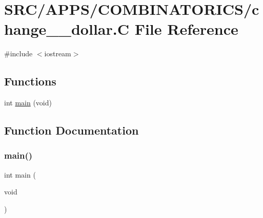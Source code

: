\hypertarget{change__1__dollar_8_c}{}\section{S\+R\+C/\+A\+P\+P\+S/\+C\+O\+M\+B\+I\+N\+A\+T\+O\+R\+I\+C\+S/change\+\_\+\_\+dollar.C File Reference}
\label{change__1__dollar_8_c}
{\ttfamily \#include $<$iostream$>$}\newline
\subsection*{Functions}
\begin{DoxyCompactItemize}
\item 
int \mbox{\hyperlink{change__1__dollar_8_c_a840291bc02cba5474a4cb46a9b9566fe}{main}} (void)
\end{DoxyCompactItemize}


\subsection{Function Documentation}
\mbox{\label{change__1__dollar_8_c_a840291bc02cba5474a4cb46a9b9566fe}} 
\subsubsection{\texorpdfstring{main()}{main()}}
{\footnotesize\ttfamily int main (\begin{DoxyParamCaption}\item[{void}]{ }\end{DoxyParamCaption})}

